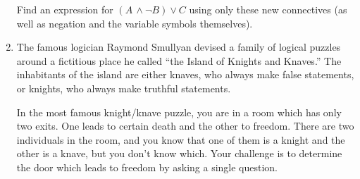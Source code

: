 \begin{enumerate}
Find an expression for $(A\, \land \lnot B) \lor C$
using only these new connectives (as well as negation and the
variable symbols themselves).

\item \label{IKK} The famous logician  Raymond Smullyan devised 
a family of logical puzzles around a fictitious place he called 
 ``the Island of Knights and Knaves.''  The inhabitants of the island are either knaves, who always make false statements, or knights, who always make truthful statements.  

In the most famous knight/knave puzzle, you are in a room which has only two exits.  One leads to certain death and the other to freedom.  There are two 
individuals in the room, and you know that one of them is a knight and the other is a knave, but you don't know which.   Your challenge is to determine the door which leads to freedom by asking a single question.

\end{enumerate}
